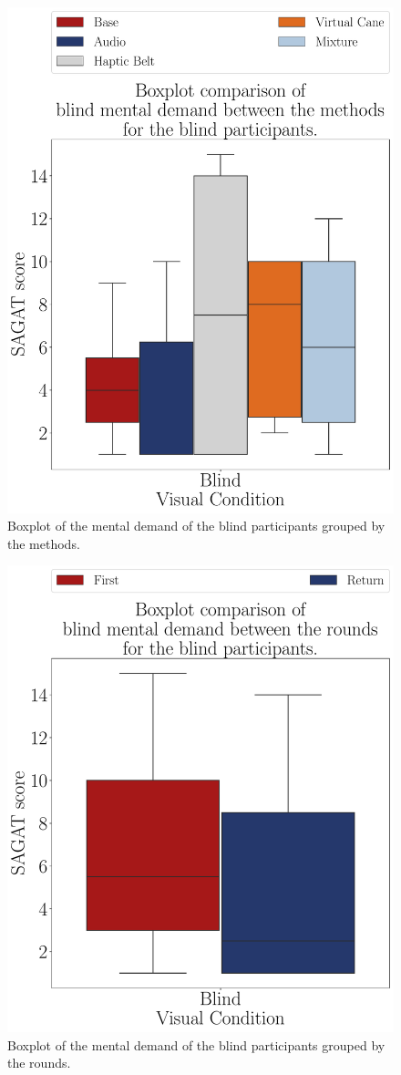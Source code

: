 \begin{figure}[!htb]
    \centering
    \includegraphics[width = 0.75\linewidth]{Resultados/Nasa/Figuras/pdf/boxplot_md_blind_scene.pdf}
    \caption{Boxplot of the mental demand of the blind participants grouped by the methods.}
    \label{fig:boxplot_md_blind_scene}
\end{figure}    
\begin{figure}[!htb]
    \centering
    \includegraphics[width = 0.75\linewidth]{Resultados/Nasa/Figuras/pdf/boxplot_md_blind_rounds.pdf}
    \caption{Boxplot of the mental demand of the blind participants grouped by the rounds.}
    \label{fig:boxplot_md_blind_rounds}
\end{figure}

